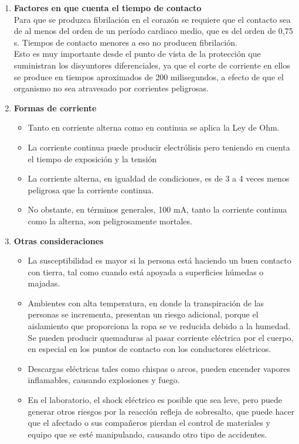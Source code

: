 \documentclass[12pt,letterpaper]{report}
\begin{document}
\begin{itemize}
\begin{enumerate}
\item \textbf{Factores en que cuenta el tiempo de contacto}\\
Para que se produzca fibrilación en el corazón se requiere que el contacto sea de
al menos del orden de un período cardiaco medio, que es del orden de 0,75 s.
Tiempos de contacto menores a eso no producen fibrilación.\\
Esto es muy importante desde el punto de vista de la protección que suministran
los disyuntores diferenciales, ya que el corte de corriente en ellos se produce en
tiempos aproximados de 200 milisegundos, a efecto de que el organismo no sea
atravesado por corrientes peligrosas.
\item \textbf{Formas de corriente}
\begin{itemize}
\item Tanto en corriente alterna como en continua se aplica la Ley de
Ohm.
\item La corriente continua puede producir electrólisis pero teniendo en
cuenta el tiempo de exposición y la tensión
\item La corriente alterna, en igualdad de condiciones, es de 3 a 4 veces
menos peligrosa que la corriente continua.
\item No obstante, en términos generales, 100 mA, tanto la corriente
continua como la alterna, son peligrosamente mortales.
\end{itemize}
\item \textbf{Otras consideraciones}
\begin{itemize}
\item La susceptibilidad es mayor si la persona está haciendo un buen
contacto con tierra, tal como cuando está apoyada a superficies
húmedas o majadas.
\item Ambientes con alta temperatura, en donde la transpiración de las
personas se incrementa, presentan un riesgo adicional, porque el
aislamiento que proporciona la ropa se ve reducida debido a la
humedad.
Se pueden producir quemaduras al pasar corriente eléctrica por el
cuerpo, en especial en los puntos de contacto con los conductores
eléctricos.
\item Descargas eléctricas tales como chispas o arcos, pueden encender
vapores inflamables, causando explosiones y fuego.
\item En el laboratorio, el shock eléctrico es posible que sea leve, pero
puede generar otros riesgos por la reacción refleja de sobresalto,
que puede hacer que el afectado o sus compañeros pierdan el
control de materiales y equipo que se esté manipulando, causando
otro tipo de accidentes.
\end{itemize}
\end{enumerate}
\end{itemize}
\end{document}
